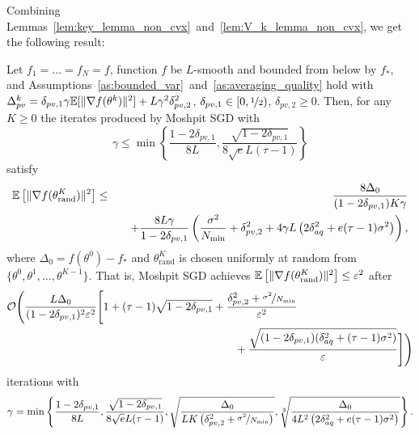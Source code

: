 Combining Lemmas~\ref{lem:key_lemma_non_cvx}~and~\ref{lem:V_k_lemma_non_cvx}, we get the following result:
\begin{theorem}
    Let $f_1 = \ldots = f_N = f$, function $f$ be $L$-smooth and bounded from below by $f_*$, and Assumptions~\ref{as:bounded_var}~and~\ref{as:averaging_quality} hold with $\Delta_{pv}^k = \delta_{pv,1}\gamma\mathbb{E}[\|\nabla f(\theta^k)\|^2] + L\gamma^2\delta_{pv,2}^2$, $\delta_{pv,1}\in [0,\nicefrac{1}{2})$, $\delta_{pv,2}\ge 0$. Then, for any $K \ge 0$ the iterates produced by Moshpit SGD with
    \begin{equation*}
        \gamma \le \min\left\{\frac{1-2\delta_{pv,1}}{8L},\frac{\sqrt{1-2\delta_{pv,1}}}{8\sqrt{e}L(\tau-1)}\right\}
    \end{equation*}
    satisfy
    \begin{eqnarray}
        \mathbb{E}\left[\|\nabla f(\theta_{\text{rand}}^K)\|^2\right] &\le& \frac{8\Delta_0}{(1-2\delta_{pv,1})K\gamma} \notag\\
        &&\quad + \frac{8L\gamma}{1-2\delta_{pv,1}}\left(\frac{\sigma^2}{N_{\min}} + \delta_{pv,2}^2 + 4\gamma L\left(2\delta_{aq}^2 + e(\tau-1)\sigma^2\right)\right), \label{eq:non_cvx_bound_supp}
    \end{eqnarray}
    where $\Delta_0 = f(\theta^0) - f_*$ and $\theta_{\text{rand}}^K$ is chosen uniformly at random from $\{\theta^0,\theta^1,\ldots,\theta^{K-1}\}$. That is, Moshpit SGD achieves $\mathbb{E}\left[\|\nabla f(\theta_{\text{rand}}^K)\|^2\right] \le \varepsilon^2$ after 
    \begin{eqnarray}
        \cO\Bigg(\frac{L\Delta_0}{(1-2\delta_{pv,1})^2\varepsilon^2}\Bigg[1 +(\tau-1)\sqrt{1-2\delta_{pv,1}} + \frac{\delta_{pv,2}^2 + \nicefrac{\sigma^2}{N_{\min}}}{\varepsilon^2}&\notag\\
        &\hspace{-2cm} + \frac{\sqrt{(1-2\delta_{pv,1})(\delta_{aq}^2+(\tau-1)\sigma^2)}}{\varepsilon}\Bigg]\Bigg)\label{eq:non_cvx_bound_2_supp}
    \end{eqnarray}
    iterations with
    \begin{equation*}
        \gamma = \min\left\{\frac{1-2\delta_{pv,1}}{8L},\frac{\sqrt{1-2\delta_{pv,1}}}{8\sqrt{e}L(\tau-1)}, \sqrt{\frac{\Delta_0}{LK\left(\delta_{pv,2}^2 + \nicefrac{\sigma^2}{N_{\min}}\right)}}, \sqrt[3]{\frac{\Delta_0}{4L^2\left(2\delta_{aq}^2 + e(\tau-1)\sigma^2\right)}}\right\}.
    \end{equation*}
\end{theorem}
